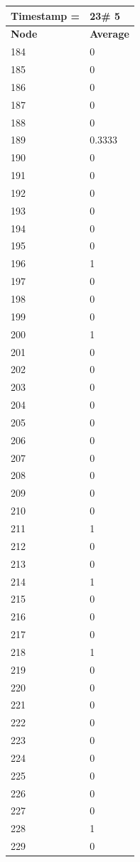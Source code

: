 \begin{tabular}{|l||l|}
\hline
\textbf{Timestamp =} & \textbf{23}\# 5\\\hline
	\textbf{Node} & \textbf{Average} \\ \hline
\hline
	184 & 0 \\ \hline
	185 & 0 \\ \hline
	186 & 0 \\ \hline
	187 & 0 \\ \hline
	188 & 0 \\ \hline
	189 & 0.3333 \\ \hline
	190 & 0 \\ \hline
	191 & 0 \\ \hline
	192 & 0 \\ \hline
	193 & 0 \\ \hline
	194 & 0 \\ \hline
	195 & 0 \\ \hline
	196 & 1 \\ \hline
	197 & 0 \\ \hline
	198 & 0 \\ \hline
	199 & 0 \\ \hline
	200 & 1 \\ \hline
	201 & 0 \\ \hline
	202 & 0 \\ \hline
	203 & 0 \\ \hline
	204 & 0 \\ \hline
	205 & 0 \\ \hline
	206 & 0 \\ \hline
	207 & 0 \\ \hline
	208 & 0 \\ \hline
	209 & 0 \\ \hline
	210 & 0 \\ \hline
	211 & 1 \\ \hline
	212 & 0 \\ \hline
	213 & 0 \\ \hline
	214 & 1 \\ \hline
	215 & 0 \\ \hline
	216 & 0 \\ \hline
	217 & 0 \\ \hline
	218 & 1 \\ \hline
	219 & 0 \\ \hline
	220 & 0 \\ \hline
	221 & 0 \\ \hline
	222 & 0 \\ \hline
	223 & 0 \\ \hline
	224 & 0 \\ \hline
	225 & 0 \\ \hline
	226 & 0 \\ \hline
	227 & 0 \\ \hline
	228 & 1 \\ \hline
	229 & 0 \\ \hline
\end{tabular}
